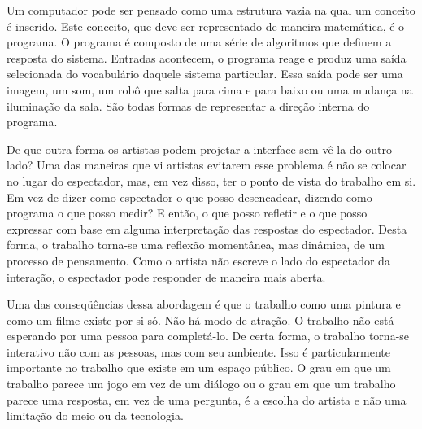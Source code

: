 Um computador pode ser pensado como uma estrutura vazia na qual um conceito é inserido. Este conceito, que deve ser representado de maneira matemática, é o programa. O programa é composto de uma série de algoritmos que definem a resposta do sistema. Entradas acontecem, o programa reage e produz uma saída selecionada do vocabulário daquele sistema particular. Essa saída pode ser uma imagem, um som, um robô que salta para cima e para baixo ou uma mudança na iluminação da sala. São todas formas de representar a direção interna do programa. \cite{campbell}

De que outra forma os artistas podem projetar a interface sem vê-la do outro lado? Uma das maneiras que vi artistas evitarem esse problema é não se colocar no lugar do espectador, mas, em vez disso, ter o ponto de vista do trabalho em si. Em vez de dizer como espectador o que posso desencadear, dizendo como programa o que posso medir? E então, o que posso refletir e o que posso expressar com base em alguma interpretação das respostas do espectador. Desta forma, o trabalho torna-se uma reflexão momentânea, mas dinâmica, de um processo de pensamento. Como o artista não escreve o lado do espectador da interação, o espectador pode responder de maneira mais aberta.

Uma das conseqüências dessa abordagem é que o trabalho como uma pintura e como um filme existe por si só. Não há modo de atração. O trabalho não está esperando por uma pessoa para completá-lo. De certa forma, o trabalho torna-se interativo não com as pessoas, mas com seu ambiente. Isso é particularmente importante no trabalho que existe em um espaço público. O grau em que um trabalho parece um jogo em vez de um diálogo ou o grau em que um trabalho parece uma resposta, em vez de uma pergunta, é a escolha do artista e não uma limitação do meio ou da tecnologia.


